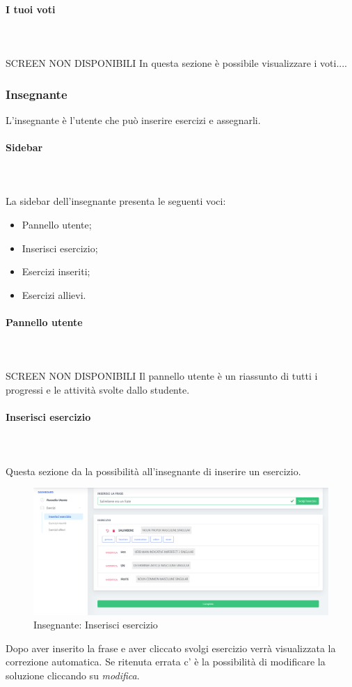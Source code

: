         \paragraph{I tuoi voti}\mbox{}\\ \\
        SCREEN NON DISPONIBILI
        In questa sezione è possibile visualizzare i voti....

    \subsubsection{Insegnante}
    L'insegnante è l'utente che può inserire esercizi e assegnarli.
        \paragraph{Sidebar}\mbox{}\\ \\
        La sidebar dell'insegnante presenta le seguenti voci:
        \begin{itemize}
            \item Pannello utente;
            \item Inserisci esercizio;
            \item Esercizi inseriti;
            \item Esercizi allievi.
        \end{itemize}
        \paragraph{Pannello utente}\mbox{}\\ \\
        SCREEN NON DISPONIBILI
        Il pannello utente è un riassunto di tutti i progressi e le attività
        svolte dallo studente.
        \paragraph{Inserisci esercizio}\mbox{}\\ \\
        Questa sezione da la possibilità all'insegnante di inserire un esercizio.
        \begin{figure}[H]
            \centering
            \includegraphics[width=17cm]{sez/img/insegnante/inserisciEsercizio.png} 
            \caption{Insegnante: Inserisci esercizio}\label{fig:1}
        \end{figure}
        Dopo aver inserito la frase e aver cliccato svolgi esercizio verrà visualizzata
        la correzione automatica. Se ritenuta errata c' è la possibilità di modificare la 
        soluzione cliccando su \textit{modifica}.
